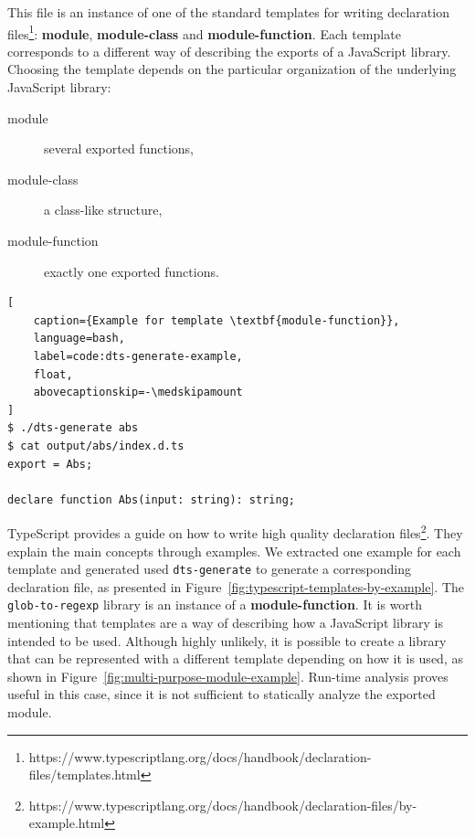 \documentclass[a4paper,english,cleveref, autoref]{lipics-v2019}
\newcommand{\figref}[1]{Figure~\ref{#1}}
\begin{document}
This file is an instance of one of the standard templates for writing
declaration
files\footnote{https://www.typescriptlang.org/docs/handbook/declaration-files/templates.html}:
\textbf{module}, \textbf{module-class} and
\textbf{module-function}. 
Each template corresponds to a different way of describing the exports
of a JavaScript library. Choosing the template depends on the
particular organization of the underlying JavaScript library:
\begin{description}
\item[module] several exported functions,
\item[module-class] a class-like structure,
\item[module-function] exactly one exported functions.
\end{description}

\begin{lstlisting}[
    caption={Example for template \textbf{module-function}},
    language=bash,
	label=code:dts-generate-example,
    float,
    abovecaptionskip=-\medskipamount
]
$ ./dts-generate abs
$ cat output/abs/index.d.ts 
export = Abs;

declare function Abs(input: string): string;
\end{lstlisting}

TypeScript provides a guide on how to write high quality declaration files\footnote{https://www.typescriptlang.org/docs/handbook/declaration-files/by-example.html}. They explain the main concepts through examples. We extracted one example for each template and generated used \texttt{dts-generate} to generate a corresponding declaration file, as presented in \figref{fig:typescript-templates-by-example}. The \texttt{glob-to-regexp} library is an instance of a \textbf{module-function}. It is worth mentioning that templates are a way of describing how a JavaScript library is intended to be used. Although highly unlikely, it is possible to create a library that can be represented with a different template depending on how it is used, as shown in \figref{fig:multi-purpose-module-example}. Run-time analysis proves useful in this case, since it is not sufficient to statically analyze the exported module.
\end{document}
